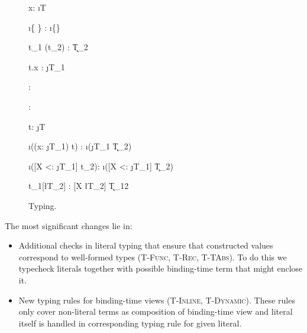 \begin{figure}[H]
  {\Gamma \tsv x: \i{T}}

  {\Gamma \tsv \i{\{  \}} : \i{\{\}}}

  {\Gamma \tsv t_1 (t_2) : \k{T_2}}

  {\Gamma \tsv t.x : \j{T_1}}

  {\Gamma \tsv {}: }

  {\Gamma \tsv {}: }

  {\Gamma \tsv t: \j{T}}

  {\Gamma \tsv \i{((x: \j{T_1}) \ra t)} : \i{(\j{T_1} \ra \k{T_2})}}

  {\Gamma \tsv \i([X <: \j{T_1}] \ra t_2): \i{([X <: \j{T_1}] \ra \k{T_2})}}

  {\Gamma \tsv t_1[\l{T_2}] : [X \mapsto \l{T_2}] \k{T_{12}}}
\caption{Typing.}
\end{figure}

The most significant changes lie in:
\begin{itemize}
  \item Additional checks in literal typing that ensure that constructed
        values correspond to well-formed types (\textsc{T-Func, T-Rec, T-TAbs}).
        To do this we typecheck literals together with possible binding-time term
        that might enclose it.
  \item New typing rules for binding-time views (\textsc{T-Inline, T-Dynamic}).
        These rules only cover non-literal terms as composition of binding-time view
        and literal itself is handled in corresponding typing rule for given literal.
\end{itemize}

